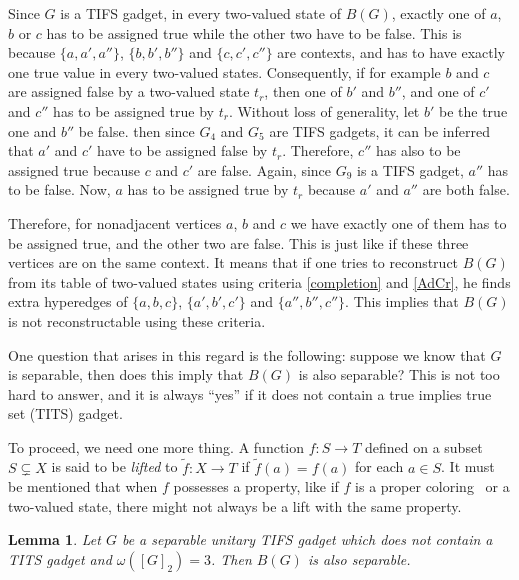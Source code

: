 \documentclass[%
12pt,
prereprint,
showpacs,
showkeys,
preprintnumbers,
amsmath,amssymb,
aps,
pra,
longbibliography,
notitlepage
]{revtex4-1}
\newtheorem{lemma}[theorem]{{\color{THM}Lemma}}
\theoremstyle{definition}
\begin{document}
        Since $G$ is a TIFS gadget, in every two-valued state of $B(G)$, exactly one of $a$, $b$ or $c$ has to be assigned true while the other two have to be false. This is because $\{a,a',a''\}$, $\{b,b',b''\}$ and $\{c,c',c''\}$ are contexts, and has to have exactly one true value in every two-valued states. Consequently, if for example $b$ and $c$ are assigned false by a two-valued state $t_r$, then one of $b'$ and $b''$, and one of $c'$ and $c''$ has to be assigned true by $t_r$. Without loss of generality, let $b'$ be the true one and $b''$ be false. then since $G_4$ and $G_5$ are TIFS gadgets, it can be inferred that $a'$ and $c'$ have to be assigned false by $t_r$. Therefore, $c''$ has also to be assigned true because $c$ and $c'$ are false. Again, since $G_9$ is a TIFS gadget, $a''$ has to be false. Now, $a$ has to be assigned true by $t_r$ because $a'$ and $a''$ are both false.

        Therefore, for nonadjacent vertices $a$, $b$ and $c$ we have exactly one of them has to be assigned true, and the other two are false. This is just like if these three vertices are on the same context. It means that if one tries to reconstruct $B(G)$ from its table of two-valued states using criteria \ref{completion} and \ref{AdCr}, he finds extra hyperedges of $\{a,b,c\}$, $\{a',b',c'\}$ and $\{a'',b'',c''\}$. This implies that $B(G)$ is not reconstructable using these criteria.

        One question that arises in this regard is the following: suppose we know that $G$ is separable, then does this imply that $B(G)$ is also separable? This is not too hard to answer, and it is always ``yes'' if it does not contain a true implies true set (TITS) gadget.

        To proceed, we need one more thing. A function $f:S\longrightarrow T$ defined on a subset $S\subsetneq X$ is said to be \emph{lifted} to $\tilde{f}:X\longrightarrow T$ if $\tilde{f}(a)=f(a)$ for each $a\in S$. It must be mentioned that when $f$ possesses a property, like if $f$ is a proper coloring~\cite{ALBERTSON1998189} or a two-valued state, there might not always be a lift with the same property.

        \begin{lemma}\label{Sep-lem}
                Let $G$ be a separable unitary TIFS gadget which does not contain a TITS gadget and $\omega ([G]_2)=3$. Then $B(G)$ is also separable.
        \end{lemma}
\end{document}
